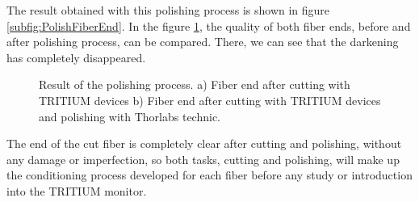 The result obtained with this polishing process is shown in figure \ref{subfig:PolishFiberEnd}. In the figure \ref{fig:ResultofPolishingProcess}, the quality of both fiber ends, before and after polishing process, can be compared. There, we can see that the darkening has completely disappeared. 

\begin{figure}[htbp]
 \centering
 \caption{Result of the polishing process. a) Fiber end after cutting with TRITIUM devices b) Fiber end after cutting with TRITIUM devices and polishing with Thorlabs technic.}
 \label{fig:ResultofPolishingProcess}
\end{figure}

The end of the cut fiber is completely clear after cutting and polishing, without any damage or imperfection, so both tasks, cutting and polishing, will make up the conditioning process developed for each fiber before any study or introduction into the TRITIUM monitor.